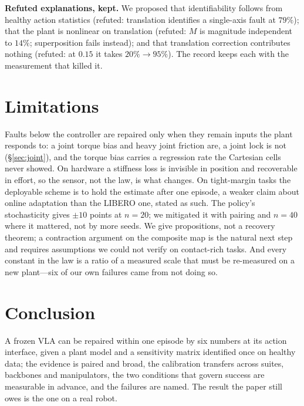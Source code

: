 \documentclass{article}
\begin{document}
\textbf{Refuted explanations, kept.} We proposed that identifiability follows from healthy
action statistics (refuted: translation identifies a single-axis fault at $79\%$); that the
plant is nonlinear on translation (refuted: $M$ is magnitude independent to $14\%$;
superposition fails instead); and that translation correction contributes nothing (refuted:
at $0.15$ it takes $20\%\to95\%$). The record keeps each with the measurement that killed it.

\section{Limitations}
\label{sec:limits}

Faults below the controller are repaired only when they remain inputs the plant responds
to: a joint torque bias and heavy joint friction are, a joint lock is not
(\S\ref{sec:joint}), and the torque bias carries a regression rate the Cartesian cells never
showed. On hardware a stiffness loss is invisible in position and recoverable in effort, so the
sensor, not the law, is what changes. On tight-margin tasks the deployable scheme is to hold
the estimate after one episode, a weaker claim about online adaptation than the LIBERO one,
stated as such. The policy's stochasticity gives $\pm10$ points at $n=20$;
we mitigated it with pairing and $n=40$ where it mattered, not by more seeds. We give
propositions, not a recovery theorem; a contraction argument on the composite map is the
natural next step and requires assumptions we could not verify on contact-rich tasks. And
every constant in the law is a ratio of a measured scale that must be re-measured on a new
plant---six of our own failures came from not doing so.

\section{Conclusion}

A frozen VLA can be repaired within one episode by six numbers at its action interface,
given a plant model and a sensitivity matrix identified once on healthy data; the evidence is
paired and broad, the calibration transfers across suites, backbones and manipulators, the
two conditions that govern success are measurable in advance, and the failures are named.
The result the paper still owes is the one on a real robot.
\end{document}

